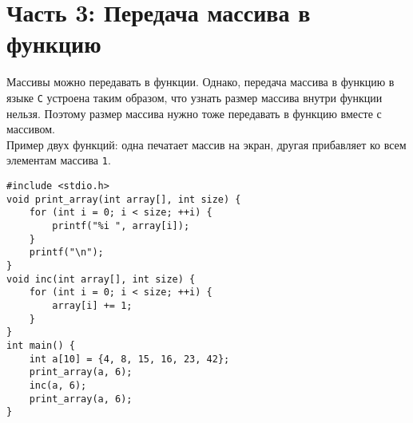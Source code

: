 \documentclass{article}
\begin{document}
\newpage
\section*{Часть 3: Передача массива в функцию}
Массивы можно передавать в функции. Однако, передача массива в функцию в языке \texttt{C} устроена таким образом, что узнать размер массива внутри функции нельзя. Поэтому размер массива нужно тоже передавать в функцию вместе с массивом.\\

Пример двух функций: одна печатает массив на экран, другая прибавляет ко всем элементам массива \texttt{1}.
\begin{lstlisting}
#include <stdio.h>
void print_array(int array[], int size) {
    for (int i = 0; i < size; ++i) {
        printf("%i ", array[i]);
    }
    printf("\n");
}
void inc(int array[], int size) {
    for (int i = 0; i < size; ++i) {
        array[i] += 1;
    }
}
int main() {
    int a[10] = {4, 8, 15, 16, 23, 42};
    print_array(a, 6);
    inc(a, 6);
    print_array(a, 6);
}
\end{lstlisting}
\end{document}
